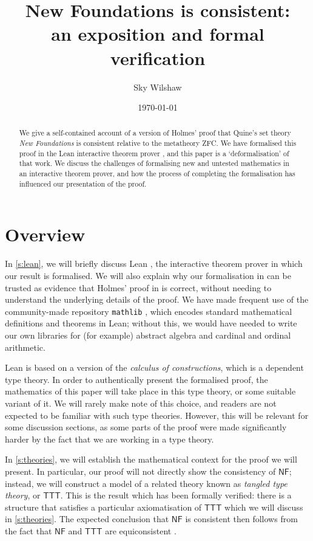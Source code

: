 \documentclass{article}
\title{New Foundations is consistent:\\an exposition and formal verification}
\author{Sky Wilshaw}
\date{\today}
\theoremstyle{definition}
\theoremstyle{remark}
\begin{document}
\maketitle

\begin{abstract}
	We give a self-contained account of a version of Holmes' proof \cite{holmes2023nf} that Quine's set theory \emph{New Foundations} \cite{quine-nf} is consistent relative to the metatheory ZFC.
	We have formalised this proof in the Lean interactive theorem prover \cite{leanprover-community-con-nf}, and this paper is a `deformalisation' of that work.
	We discuss the challenges of formalising new and untested mathematics in an interactive theorem prover, and how the process of completing the formalisation has influenced our presentation of the proof.
\end{abstract}

\tableofcontents

\section{Overview}
\label{s:overview}

In \cref{s:lean}, we will briefly discuss Lean \cite{lean}, the interactive theorem prover in which our result is formalised.
We will also explain why our formalisation in \cite{leanprover-community-con-nf} can be trusted as evidence that Holmes' proof in \cite{holmes2023nf} is correct, without needing to understand the underlying details of the proof.
We have made frequent use of the community-made repository \texttt{mathlib} \cite{mathlib2020}, which encodes standard mathematical definitions and theorems in Lean; without this, we would have needed to write our own libraries for (for example) abstract algebra and cardinal and ordinal arithmetic.

Lean is based on a version of the \emph{calculus of constructions}, which is a dependent type theory.
In order to authentically present the formalised proof, the mathematics of this paper will take place in this type theory, or some suitable variant of it.
We will rarely make note of this choice, and readers are not expected to be familiar with such type theories.
However, this will be relevant for some discussion sections, as some parts of the proof were made significantly harder by the fact that we are working in a type theory.

In \cref{s:theories}, we will establish the mathematical context for the proof we will present.
In particular, our proof will not directly show the consistency of \( \mathsf{NF} \); instead, we will construct a model of a related theory known as \emph{tangled type theory}, or \( \mathsf{TTT} \).
This is the result which has been formally verified: there is a structure that satisfies a particular axiomatisation of \( \mathsf{TTT} \) which we will discuss in \cref{s:theories}.
The expected conclusion that \( \mathsf{NF} \) is consistent then follows from the fact that \( \mathsf{NF} \) and \( \mathsf{TTT} \) are equiconsistent \cite{holmes-ttt}.
\end{document}
